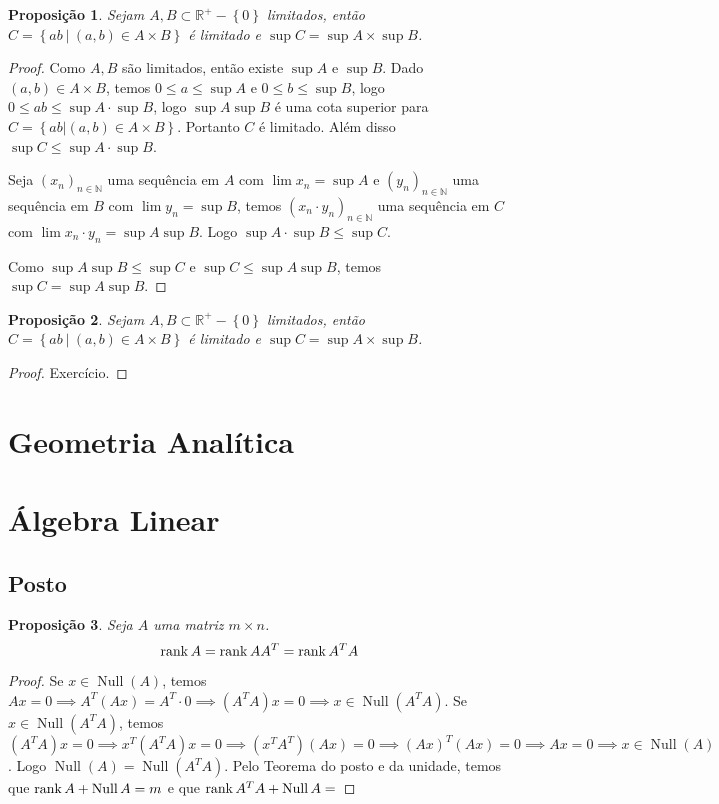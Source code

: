 \documentclass{article}
\newtheorem{prop}{Proposição}[section]
\theoremstyle{theorem}
\theoremstyle{lemma}
\theoremstyle{definition}
\theoremstyle{remark}
\DeclareMathOperator{\Null}{Null}
\begin{document}
\begin{prop}
	Sejam $A,B\subset \mathbb{R}^{+}-\left\{0\right\}$ limitados, então $C = \left\{ ab \: | \: (a,b) \in A\times B \right\}$ é limitado e $\sup C = \sup A \times \sup B$.
\end{prop}
\begin{proof}
	Como $A,B$ são limitados, então existe $\sup A$ e $\sup B$.
	Dado $(a,b) \in A\times B$, temos $ 0 \leq a \leq \sup A $ e $0\leq b \leq \sup B$, logo $0\leq ab \leq \sup A\cdot \sup B$, logo $\sup A \sup B$ é uma cota superior para $ C = \left\{ ab | (a,b) \in A\times B \right\}$. Portanto $C$ é limitado.  Além disso $\sup C  \leq \sup A \cdot \sup B$.


	Seja $(x_n)_{n\in \mathbb{N}}$ uma sequência em $A$ com $\lim x_n = \sup A$ e $(y_n)_{n\in \mathbb{N}}$ uma sequência em $B$ com $\lim y_n = \sup B$, temos $(x_n\cdot y_n)_{n \in \mathbb{N}}$ uma sequência em $C$ com $\lim x_n \cdot y_n = \sup A \sup B$. Logo $\sup A \cdot \sup B  \leq \sup C$.


	Como $\sup A \sup B \leq \sup C$ e $\sup C \leq \sup A \sup B$, temos $\sup C = \sup A \sup B$.

\end{proof}
\begin{prop}
	Sejam $A,B\subset \mathbb{R}^{+}-\left\{0\right\}$ limitados, então $C = \left\{ ab \: | \: (a,b) \in A\times B \right\}$ é limitado e $\sup C = \sup A \times \sup B$.
\end{prop}
\begin{proof}
	Exercício. %
\end{proof}



\section{Geometria Analítica}
\section{Álgebra Linear}
\subsection{Posto}
\begin{prop}
	Seja $A$ uma matriz $m\times n$.
	$$\rank{A} = \rank{A A^T} = \rank{A^T A}$$
\end{prop}
\begin{proof}
	Se $x\in \Null(A)$, temos $Ax = 0 \implies A^T (Ax) = A^T \cdot 0 \implies (A^T A) x = 0 \implies x \in \Null(A^T A)$. Se $x\in \Null(A^T A)$, temos $(A^T A)x = 0 \implies x^T (A^T A) x = 0 \implies (x^TA^T)(Ax) = 0 \implies  (Ax)^T (Ax) = 0 \implies Ax = 0 \implies x \in \Null(A)$. Logo $\Null(A) = \Null(A^T A)$. Pelo Teorema do posto e da unidade, temos que $\rank A + \Null A = m$ e que $\rank A^TA +\Null A = $ %
\end{proof}
\end{document}
